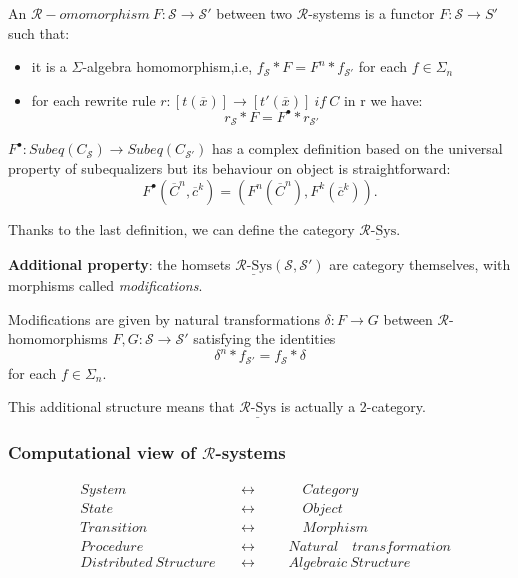 \documentclass{beamer}
\begin{document}
\begin{frame}
    \scriptsize
    An $\mathcal{R}-omomorphism\ F: \mathcal{S} \rightarrow \mathcal{S}'$ between two $\mathcal{R}$-systems is a 
    functor $F:\mathcal{S} \rightarrow S'$ such that:
    \begin{itemize}
        \item it is a $\Sigma$-algebra homomorphism,i.e, $f_\mathcal{S}*F = F^n*f_{\mathcal{S}'}$ for each $f \in \Sigma_n$
        \item for each rewrite rule $r:[t(\overline{x})] \rightarrow [t'(\overline{x})]\ if\ C$ in r we have: 
        $$ r_\mathcal{S} * F = F^\bullet * r_{\mathcal{S}'} $$
    \end{itemize}
    $F^\bullet:Subeq(C_\mathcal{S}) \rightarrow Subeq(C_{\mathcal{S}'})$ has  a complex definition based on the universal property of subequalizers 
    but its behaviour on object is straightforward: 
    $$F^\bullet(\overline{C}^n,\overline{c}^k) = (F^n(\overline{C}^n),F^k(\overline{c}^k)). $$

 
    \pause 
    Thanks to the last definition, we can define the category $\underline{\mathcal{R}\text{-Sys}}$. 

    \medskip
    \pause
    \textbf{Additional property}: the homsets $\underline{\mathcal{R}\text{-Sys}}(\mathcal{S},\mathcal{S}')$ are 
    category themselves, with morphisms called \emph{modifications}.

    Modifications are given by natural transformations $\delta: F \rightarrow G$ between $\mathcal{R}$-homomorphisms 
    $F,G:\mathcal{S} \rightarrow \mathcal{S}'$ satisfying the identities
    $$\delta^n * f_{\mathcal{S}'} =  f_\mathcal{S} * \delta$$
    for each $f \in \Sigma_n$. 

    \medskip
    \pause
    This additional structure means that $\underline{\mathcal{R}\text{-Sys}}$ is actually a 2-category.
\end{frame}
\begin{frame}
    \frametitle{Computational view of $\mathcal{R}$-systems}
    \large
    \begin{align*}
        &System \quad &&\leftrightarrow  &&&\quad Category \\
        &State \quad &&\leftrightarrow &&&\quad  Object \\
        &Transition \quad &&\leftrightarrow &&&\quad Morphism \\ 
        &Procedure \quad &&\leftrightarrow &&&Natural \quad transformation \\ 
        &Distributed\ Structure\ &&\leftrightarrow &&& Algebraic\ Structure 
    \end{align*}
\end{frame}
\end{document}
